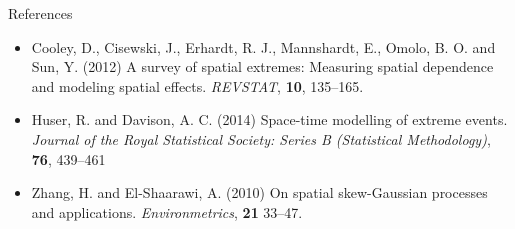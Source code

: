 \documentclass{beamer}
\begin{document}
\begin{frame}{References}
  \begin{itemize} \setlength{\itemsep}{0.5em}
    \item Cooley, D., Cisewski, J., Erhardt, R. J., Mannshardt, E., Omolo, B. O. and Sun, Y. (2012) A survey of spatial extremes: Measuring spatial dependence and modeling spatial effects. {\it REVSTAT}, {\bf 10}, 135--165.
    \item Huser, R. and Davison, A. C. (2014) Space-time modelling of extreme events. {\it Journal of the Royal Statistical Society: Series B (Statistical Methodology)}, {\bf 76}, 439--461
    \item Zhang, H. and El-Shaarawi, A. (2010) On spatial skew-Gaussian processes and applications. {\it Environmetrics}, {\bf 21} 33--47.
  \end{itemize}
\end{frame}
\end{document}
